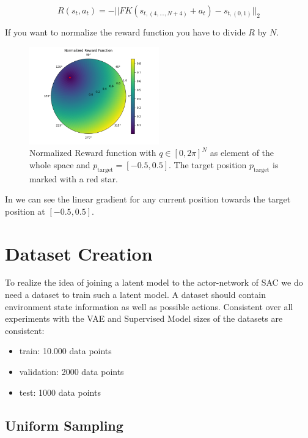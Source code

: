 \begin{equation}\label{eqn:Rewardfunction}
    R(s_t, a_t) = - ||FK(s_{t, (4, \ldots, N + 4)}  + a_t) - s_{t, (0 ,1)}||_2
\end{equation}

If you want to normalize the reward function you have to divide $R$ by $N$.

\begin{figure}[h]
    \centering
    \includegraphics[width=0.5\textwidth,]{figures/methodology/RewardFunction.png}
    \caption[Reward function]{Normalized Reward function with $q \in [0, 2\pi]^N$ as element of the whole space and $p_\text{target} = [-0.5, 0.5]$. The target position $p_\text{target}$ is marked with a red star.}
    \label{fig:Reward_function}
\end{figure}

In  we can see the linear gradient for any current position towards the target position at $[-0.5, 0.5]$.

\section{Dataset Creation}\label{sec:Dataset_creation}

To realize the idea of joining a latent model to the actor-network of SAC we do need a dataset to train such a latent model. A dataset should contain environment state information as well as possible actions.
Consistent over all experiments with the VAE and Supervised Model sizes of the datasets are consistent:
\begin{itemize}
    \item train: 10.000 data points
    \item validation: 2000 data points
    \item test: 1000 data points
\end{itemize}

\subsection{Uniform Sampling} \label{sec:vanilla_sampling}

